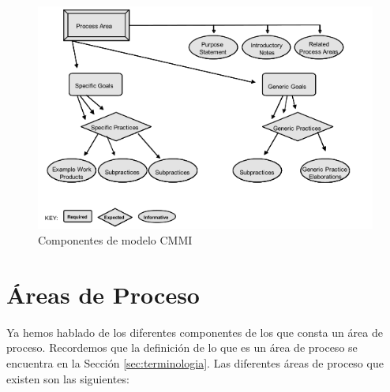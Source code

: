 \begin{itemize}
\begin{figure}[h]
	\centering
	\includegraphics[scale=1]{Images/modelcom.PNG}
	\caption{Componentes de modelo CMMI}
	\label{fig:modelcom}
\end{figure}

\section{Áreas de Proceso}
Ya hemos hablado de los diferentes componentes de los que consta un área de proceso. Recordemos que la definición de lo que es un área de proceso se encuentra en la Sección \ref{sec:terminologia}. Las diferentes áreas de proceso que existen son las siguientes:


\end{itemize}
